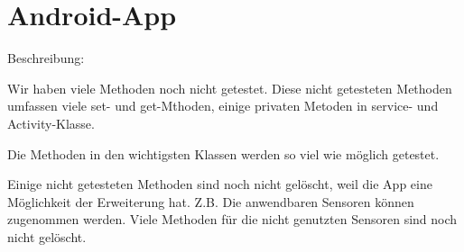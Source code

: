 \documentclass[a4paper]{scrreprt}
\begin{document}
			\section{Android-App}
                 Beschreibung:
                 \par Wir haben viele Methoden noch nicht getestet. Diese nicht getesteten Methoden umfassen viele set- und get-Mthoden, einige privaten Metoden in service- und Activity-Klasse.
                 \par Die Methoden in den wichtigsten Klassen werden so viel wie m\"oglich getestet.
                 \par Einige nicht getesteten Methoden sind noch nicht gelöscht, weil die App eine M\"oglichkeit der Erweiterung hat. Z.B. Die anwendbaren Sensoren können zugenommen werden. Viele Methoden f\"ur die nicht genutzten Sensoren sind noch nicht gelöscht.
\end{document}
